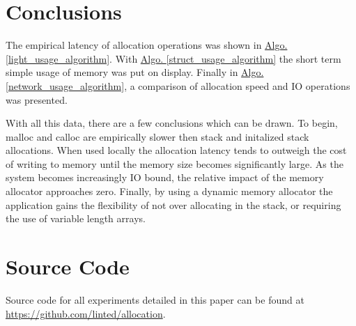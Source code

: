 \documentclass[letterpaper, 10 pt, conference]{ieeeconf}  %
\newcommand*\GitHubLoc{https://github.com/linted/allocation}
\begin{document}


\section{Conclusions}
The empirical latency of allocation operations was shown in \hyperref[light_usage_algorithm]{Algo. \ref*{light_usage_algorithm}}.
With \hyperref[struct_usage_algorithm]{Algo. \ref*{struct_usage_algorithm}} the short term simple usage of memory was put on display.
Finally in \hyperref[network_usage_algorithm]{Algo. \ref*{network_usage_algorithm}}, a comparison of allocation speed and IO operations was presented.

With all this data, there are a few conclusions which can be drawn.
To begin, malloc and calloc are empirically slower then stack and initalized stack allocations.
When used locally the allocation latency tends to outweigh the cost of writing to memory until the memory size becomes significantly large.
As the system becomes increasingly IO bound, the relative impact of the memory allocator approaches zero.
Finally, by using a dynamic memory allocator the application gains the flexibility of not over allocating in the stack, or requiring the use of variable length arrays.

\section{Source Code}

Source code for all experiments detailed in this paper can be found at \url{\GitHubLoc}.





\clearpage
\end{document}
